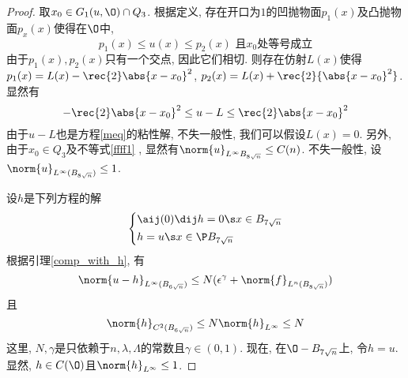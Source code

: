 \begin{proof}
    取$x_0 \in G_1(u, \O) \cap Q_3$.  根据定义, 存在开口为$1$的凹抛物面$p_1(x)$及凸抛物面$p_x(x)$使得在$\O$中, 
    \begin{equation}
        p_1(x) \le u(x) \le p_2(x) \text{ 且$x_0$处等号成立}
    \end{equation}
    由于$p_1(x), p_2(x)$只有一个交点, 因此它们相切.  则存在仿射$L(x)$使得$p_1(x)=L(x)-\rec{2}\abs{x-x_0}^2$, $p_2(x)=L(x)+\rec{2}{\abs{x-x_0}^2}$.  显然有
    \begin{equation} \label{ffff1}
        -\rec{2}\abs{x-x_0}^2 \le u-L \le \rec{2}\abs{x-x_0}^2
    \end{equation}
    由于$u-L$也是方程\eqref{meq}的粘性解, 不失一般性, 我们可以假设$L(x)=0$.  另外, 由于$x_0 \in Q_3$及不等式\eqref{ffff1} , 显然有$\norm{u}_{L^\infty{B_{8\sqrt{n}}}} \le C(n)$.  不失一般性, 设$\norm{u}_{L^\infty(B_{8\sqrt{n}})} \le 1$.  \par
    设$h$是下列方程的解$$\left\{ \begin{aligned}
        & \aij(0)\dij h=0  \s x \in B_{7\sqrt{n}}\\
        & h=u \s x \in \P B_{7\sqrt{n}}
    \end{aligned}
    \right.  $$
    根据引理\eqref{comp_with_h}, 有
    \begin{equation}\label{dddd2}
        \norm{u-h}_{L^\infty(B_{6\sqrt{n}})} \le N(\epsilon^\gamma + \norm{f}_{L^n(B_{8\sqrt{n}})})
    \end{equation}
    且
    \begin{equation} \label{dddd1}
        \norm{h}_{C^2(B_{6\sqrt{n}})} \le N\norm{h}_{L^\infty} \le N
    \end{equation}
    这里, $N, \gamma$是只依赖于$n, \lambda, \Lambda$的常数且$\gamma \in (0, 1)$.  现在, 在$\O - B_{7\sqrt{n}}$上, 令$h=u$.  显然, $h \in C(\O)$且$\norm{h}_{L^\infty} \le 1$.  \par

\end{proof}
